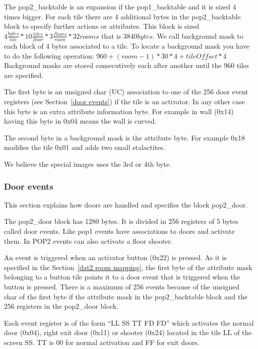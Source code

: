 \documentclass{article}
\begin{document}
 The pop2\_backtable is an expansion if the pop1\_backtable and it is sized
 4 times bigger. For each tile there are 4 additional bytes in the 
 pop2\_backtable block to specify further actions or attributes. This block
 is sized $4 \frac{bytes}{tile} * 10 \frac{tiles}{floor} * 3 \frac{floors}{room} * 32 rooms$ that is
 $3840 bytes$.
 We call background mask to each block of 4 bytes associated to a tile. To
 locate a background mask you have to do the following operation:
  $960+(room-1)*30*4+tileOffset*4$
 Background masks are stored consecutively each after another until the
 960 tiles are specified.
 
 The first byte is an unsigned char (UC) association to one of the 256 door
 event registers (see Section~\ref{door events}) if the tile is an activator.
 In any other case this byte is an extra attribute information byte.
 For example in wall (0x14) having this byte in 0x04 means the wall is
 curved.
 
 The second byte in a background mask is the attribute byte. For example
 0x18 modifies the tile 0x01 and adds two small stalactites.
 
 We believe the special images uses the 3rd or 4th byte.

\subsubsection{Door events \label{door events}} %
 This section explains how doors are handled and specifies the block
 pop2\_door.

 The pop2\_door block has 1280 bytes. It is divided in 256 registers of
 5 bytes called door events. Like pop1 events have associations to doors
 and activate them. In POP2 events can also activate a floor shooter.
 
 An event is triggered when an activator button (0x22) is pressed. As it is
 specified in the Section~\ref{dat2 room mapping}, the first byte of the attribute mask
 belonging to a button tile points it to a door event that is triggered
 when the button is pressed.
 There is a maximum of 256 events because of the unsigned char of the first
 byte if the attribute mask in the pop2\_backtable block and the 256
 registers in the pop2\_door block.

 Each event register is of the form ``LL SS TT FD FD'' which activates the
 normal door (0x04), right exit door (0x11) or shooter (0x24) located in
 the tile LL of the screen SS. TT is 00 for normal activation and FF for
 exit doors.
\end{document}
